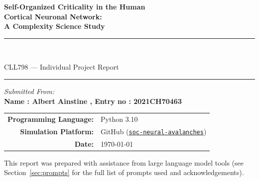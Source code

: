 \documentclass[12pt,a4paper]{article}
\begin{document}
\begin{titlepage}
  \centering
  \vspace*{1.5cm}
  {\LARGE\bfseries Self-Organized Criticality in the Human\\[0.4em]
  Cortical Neuronal Network:\\[0.4em]
  A Complexity Science Study\par}
  \vspace{0.8cm}
  \rule{\linewidth}{0.5pt}\\[0.4cm]
  {\large CLL798 — Individual Project Report\par}
  \rule{\linewidth}{0.5pt}
  \vspace{1.5cm}

  {\large \textit{Submitted From:}\\[0.3em]
  \textbf{Name : Albert Ainstine , Entry no : 2021CH70463}\\
  \par}
  \vspace{2.5cm}

  {\normalsize
  \begin{tabular}{rl}
    
    \textbf{Programming Language:} & Python 3.10 \\[4pt]
    \textbf{Simulation Platform:} & GitHub (\href{https://github.com/AlbertAinstine578/CLL798---Individual-Project}{\texttt{soc-neural-avalanches}}) \\[4pt]
    \textbf{Date:} & \today \\
  \end{tabular}
  }
  \vfill
  {\small This report was prepared with assistance from large language model tools (see Section~\ref{sec:prompts} for the full list of prompts used and acknowledgements).}
\end{titlepage}

\begin{abstract}
\noindent
The human cerebral cortex is one of the most striking examples of a
complex system that spontaneously organises itself to the boundary
between order and disorder — a state known as the \emph{self-organized
critical} (SOC) state.  In this state, neural activity propagates as
scale-free \emph{avalanches} whose size and duration distributions
follow power laws, a hallmark prediction of SOC theory first
formulated by Bak, Tang, and Wiesenfeld (1987).  We present a
systematic computational study of a two-dimensional lattice-based
integrate-and-fire neuronal model, adapted from the celebrated BTW
sandpile.  By varying the effective connectivity $k$ (from sparse
nearest-neighbour coupling to dense random-graph coupling) we
demonstrate that the system approaches criticality near the
theoretical branching ratio $\sigma = 1$, produces power-law
avalanche-size distributions with exponent $\alpha \approx 1.5$, and
that both the exponent and the mean avalanche size shift
systematically with $k$.  These findings recapitulate the central
features of neuronal criticality and provide quantitative insight into
how synaptic connectivity shapes the collective dynamics of cortical
circuits.
\end{abstract}
\end{document}
